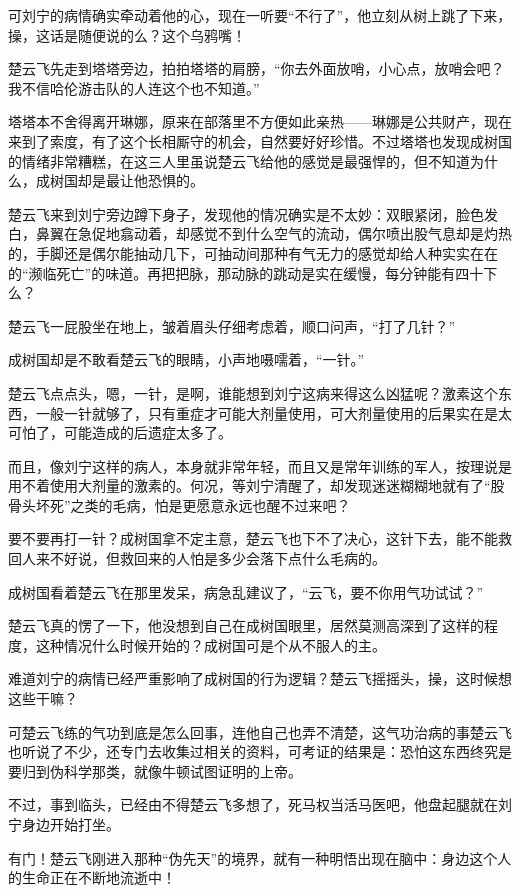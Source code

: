 可刘宁的病情确实牵动着他的心，现在一听要“不行了”，他立刻从树上跳了下来，操，这话是随便说的么？这个乌鸦嘴！

楚云飞先走到塔塔旁边，拍拍塔塔的肩膀，“你去外面放哨，小心点，放哨会吧？我不信哈伦游击队的人连这个也不知道。”

塔塔本不舍得离开琳娜，原来在部落里不方便如此亲热——琳娜是公共财产，现在来到了索度，有了这个长相厮守的机会，自然要好好珍惜。不过塔塔也发现成树国的情绪非常糟糕，在这三人里虽说楚云飞给他的感觉是最强悍的，但不知道为什么，成树国却是最让他恐惧的。

楚云飞来到刘宁旁边蹲下身子，发现他的情况确实是不太妙：双眼紧闭，脸色发白，鼻翼在急促地翕动着，却感觉不到什么空气的流动，偶尔喷出股气息却是灼热的，手脚还是偶尔能抽动几下，可抽动间那种有气无力的感觉却给人种实实在在的“濒临死亡”的味道。再把把脉，那动脉的跳动是实在缓慢，每分钟能有四十下么？

楚云飞一屁股坐在地上，皱着眉头仔细考虑着，顺口问声，“打了几针？”

成树国却是不敢看楚云飞的眼睛，小声地嗫嚅着，“一针。”

楚云飞点点头，嗯，一针，是啊，谁能想到刘宁这病来得这么凶猛呢？激素这个东西，一般一针就够了，只有重症才可能大剂量使用，可大剂量使用的后果实在是太可怕了，可能造成的后遗症太多了。

而且，像刘宁这样的病人，本身就非常年轻，而且又是常年训练的军人，按理说是用不着使用大剂量的激素的。何况，等刘宁清醒了，却发现迷迷糊糊地就有了“股骨头坏死”之类的毛病，怕是更愿意永远也醒不过来吧？

要不要再打一针？成树国拿不定主意，楚云飞也下不了决心，这针下去，能不能救回人来不好说，但救回来的人怕是多少会落下点什么毛病的。

成树国看着楚云飞在那里发呆，病急乱建议了，“云飞，要不你用气功试试？”

楚云飞真的愣了一下，他没想到自己在成树国眼里，居然莫测高深到了这样的程度，这种情况什么时候开始的？成树国可是个从不服人的主。

难道刘宁的病情已经严重影响了成树国的行为逻辑？楚云飞摇摇头，操，这时候想这些干嘛？

可楚云飞练的气功到底是怎么回事，连他自己也弄不清楚，这气功治病的事楚云飞也听说了不少，还专门去收集过相关的资料，可考证的结果是：恐怕这东西终究是要归到伪科学那类，就像牛顿试图证明的上帝。

不过，事到临头，已经由不得楚云飞多想了，死马权当活马医吧，他盘起腿就在刘宁身边开始打坐。

有门！楚云飞刚进入那种“伪先天”的境界，就有一种明悟出现在脑中：身边这个人的生命正在不断地流逝中！

